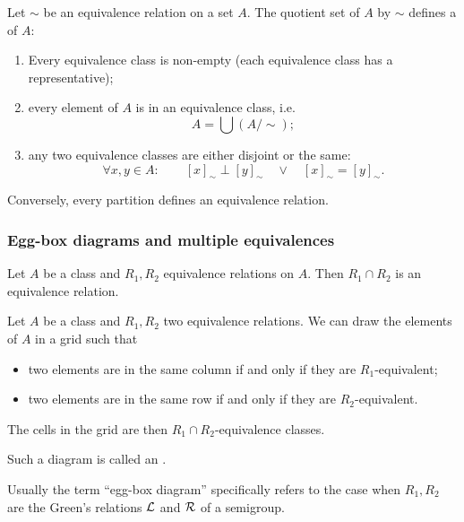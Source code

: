 \begin{proposition}
Let $\sim$ be an equivalence relation on a set $A$. The quotient set of $A$ by $\sim$ defines a  of $A$:
\begin{enumerate}
\item Every equivalence class is non-empty (each equivalence class has a representative);
\item every element of $A$ is in an equivalence class, i.e.\
\[ A = \bigcup (A/\sim); \]
\item any two equivalence classes are either disjoint or the same:
\[ \forall x,y\in A: \qquad[x]_\sim \perp [y]_\sim \quad \lor \quad [x]_\sim = [y]_\sim. \]
\end{enumerate}
Conversely, every partition defines an equivalence relation.
\end{proposition}

\subsubsection{Egg-box diagrams and multiple equivalences}
\begin{lemma}
Let $A$ be a class and $R_1, R_2$ equivalence relations on $A$. Then $R_1 \cap R_2$ is an equivalence relation.
\end{lemma}

\begin{definition}
Let $A$ be a class and $R_1, R_2$ two equivalence relations. We can draw the elements of $A$ in a grid such that
\begin{itemize}
\item two elements are in the same column \textup{if and only if} they are $R_1$-equivalent;
\item two elements are in the same row \textup{if and only if} they are $R_2$-equivalent.
\end{itemize}
The cells in the grid are then $R_1\cap R_2$-equivalence classes.

Such a diagram is called an .
\end{definition}

Usually the term ``egg-box diagram'' specifically refers to the case when $R_1, R_2$ are the Green's relations $\mathcal{L}$ and $\mathcal{R}$ of a semigroup.

